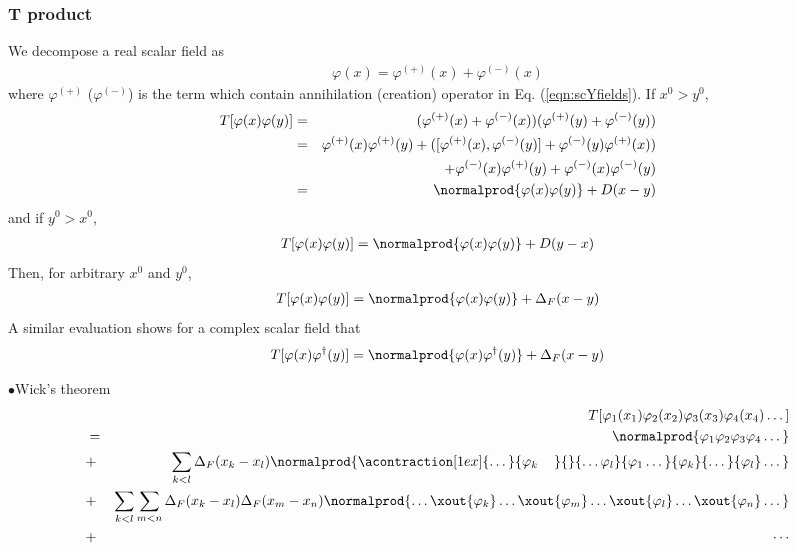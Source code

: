 \subsubsection{T product}
We decompose a real scalar field as 
\begin{eqnarray}
\varphi(x) = \varphi^{(+)}(x) + \varphi^{(-)}(x)
\end{eqnarray}
where $\varphi^{(+)}$ ($\varphi^{(-)}$) is the term which contain
annihilation (creation) operator in Eq. (\ref{eqn:scYfields}).
If $x^0 > y^0$,
\begin{eqnarray}
T[ \varphi(x) \varphi(y)]
&=& (\varphi^{(+)}(x) + \varphi^{(-)}(x))(\varphi^{(+)}(y) + \varphi^{(-)}(y))
\nonumber\\
&=&
\varphi^{(+)}(x) \varphi^{(+)}(y)
+
( [\varphi^{(+)}(x), \varphi^{(-)}(y)] 
+ \varphi^{(-)}(y) \varphi^{(+)}(x) )
\nonumber\\
&&
+
\varphi^{(-)}(x) \varphi^{(+)}(y)
+
\varphi^{(-)}(x) \varphi^{(-)}(y)
\nonumber\\
&=&
\normalprod{\varphi(x) \varphi(y)} + D(x-y)
\nonumber
\end{eqnarray}
and if $y^0 > x^0$,
\begin{eqnarray}
T[ \varphi(x) \varphi(y)]
=
\normalprod{\varphi(x) \varphi(y)} + D(y-x)
\nonumber
\end{eqnarray}
Then, for arbitrary $x^0$ and $y^0$,
\begin{eqnarray}
T[ \varphi(x) \varphi(y)]
=
\normalprod{\varphi(x) \varphi(y)} + \Delta_F(x-y)
\end{eqnarray}
A similar evaluation shows for a complex scalar field that
\begin{eqnarray}
T[ \varphi(x) \varphi^\dagger(y)]
=
\normalprod{\varphi(x) \varphi^\dagger(y)} + \Delta_F(x-y)
\end{eqnarray}

\noindent
$\bullet$Wick's theorem\\
\begin{eqnarray}
&&T[\varphi_1(x_1) \varphi_2(x_2) \varphi_3(x_3) \varphi_4(x_4) \dots]
\nonumber\\
&=& \normalprod{\varphi_1 \varphi_2 \varphi_3 \varphi_4 \dots}
\nonumber\\
&+&
\sum_{k<l} \Delta_F(x_k - x_l)
\normalprod{
\acontraction[1ex]{\dots}{\varphi_k\hphantom{\varphi_k}}{}{\dots\varphi_l}
{\varphi_1\dots}{\varphi_k}{\dots}{\varphi_l} \dots
}%
\nonumber\\
&+&
\sum_{k<l} \sum_{m<n} \Delta_F(x_k - x_l) \Delta_F(x_m - x_n)
\normalprod{\dots \xout{\varphi_k} \dots \xout{\varphi_m} \dots \xout{\varphi_l} \dots
\xout{\varphi_n} \dots}
\nonumber\\
&+& \cdots
\end{eqnarray}


